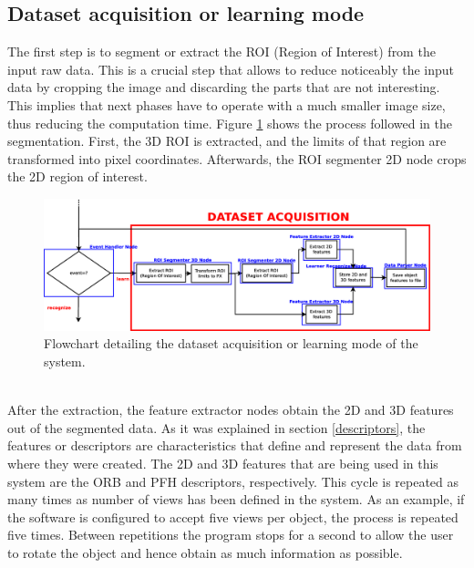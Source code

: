 \subsection{Dataset acquisition or learning mode}
\label{learning_mode}
The first step is to segment or extract the ROI (Region of Interest) from the input raw data. 
This is a crucial step that allows to reduce noticeably the input data by cropping the image and discarding the parts that are not interesting. 
This implies that next phases have to operate with a much smaller image size, thus reducing the computation time. 
Figure \ref{flowchart2} shows the process followed in the segmentation. 
First, the 3D ROI is extracted, and the limits of that region are transformed into pixel coordinates. 
Afterwards, the ROI segmenter 2D node crops the 2D region of interest. 
\begin{figure}[H]
	\begin{center}
\includegraphics[width=\linewidth]{img/diagrams/flowchart2.eps}
	\caption[Dataset acquisition flowchart]{Flowchart detailing the dataset acquisition or learning mode of the system.}
		\label{flowchart2}

	\end{center}
\end{figure}


\\
\newpage
After the extraction, the feature extractor nodes obtain the 2D and 3D features out of the segmented data. 
As it was explained in section \ref{descriptors}, the features or descriptors are characteristics that define and represent the data from where they were created. 
The 2D and 3D features that are being used in this system are the ORB and PFH descriptors, respectively. 
This cycle is repeated as many times as number of views has been defined in the system. 
As an example, if the software is configured to accept five views per object, the process is repeated five times. 
Between repetitions the program stops for a second to allow the user to rotate the object and hence obtain as much information as possible. 
\\

